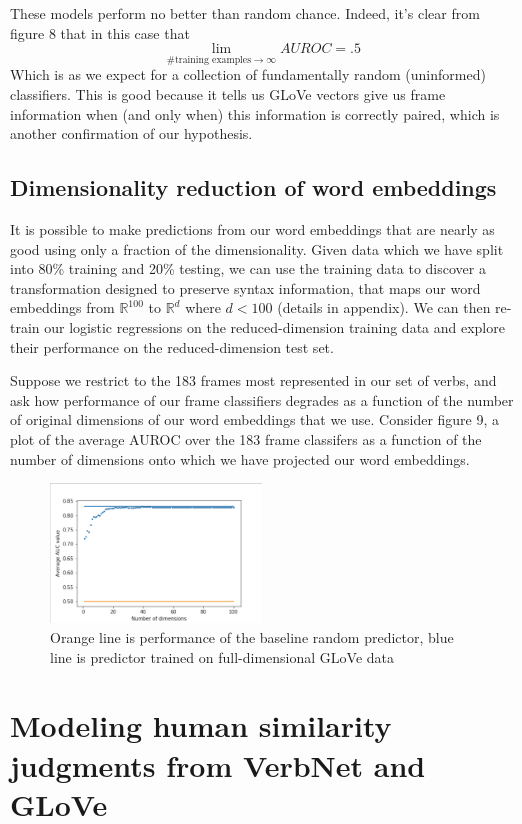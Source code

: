 \documentclass[11pt,a4paper]{article}
\begin{document}
These models perform no better than random chance. Indeed, it's clear from figure 8 that in this case that 
\[  \lim_{\# \text{training examples} \rightarrow \infty} AUROC = .5 \]
Which is as we expect for a collection of fundamentally random (uninformed) classifiers. This is good because it tells us GLoVe vectors give us frame information when (and only when) this information is correctly paired, which is another confirmation of our hypothesis.

\subsection{Dimensionality reduction of word embeddings}
It is possible to make predictions from our word embeddings that are nearly as good using only a fraction of the dimensionality. Given data which we have split into 80\% training and 20\% testing, we can use the training data to discover a transformation designed to preserve syntax information, that maps our word embeddings from $\mathbb{R}^{100}$ to $\mathbb{R}^d$ where $d < 100$ (details in appendix). We can then re-train our logistic regressions on the reduced-dimension training data and explore their performance on the reduced-dimension test set. 

Suppose we restrict to the 183 frames most represented in our set of verbs, and ask how performance of our frame classifiers degrades as a function of the number of original dimensions of our word embeddings that we use. Consider figure 9, a plot of the average AUROC over the 183 frame classifers as a function of the number of dimensions onto which we have projected our word embeddings.

\begin{figure}
	\centering
	\includegraphics[width=0.5\textwidth]{aucbydimension.png}
	\caption{\label{fig:frog} Orange line is performance of the baseline random predictor, blue line is predictor trained on full-dimensional GLoVe data}
\end{figure}

 
\section{Modeling human similarity judgments from VerbNet and GLoVe}
\end{document}
